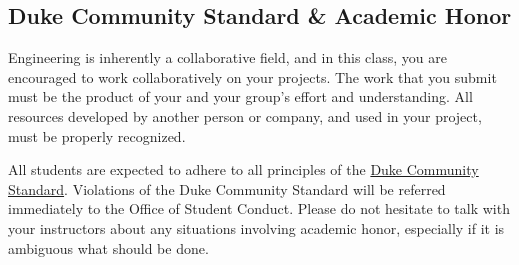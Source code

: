 \subsection*{Duke Community Standard \& Academic Honor}
Engineering is inherently a collaborative field, and in this class, you
are encouraged to work collaboratively on your projects. The work that
you submit must be the product of your and your group's effort and
understanding. All resources developed by another person or company, and
used in your project, must be properly recognized.

All students are expected to adhere to all principles of the
\href{http://www.integrity.duke.edu/standard.html}{Duke Community
Standard}. Violations of the Duke Community Standard will be referred
immediately to the Office of Student Conduct. Please do not hesitate to
talk with your instructors about any situations involving academic
honor, especially if it is ambiguous what should be done.


